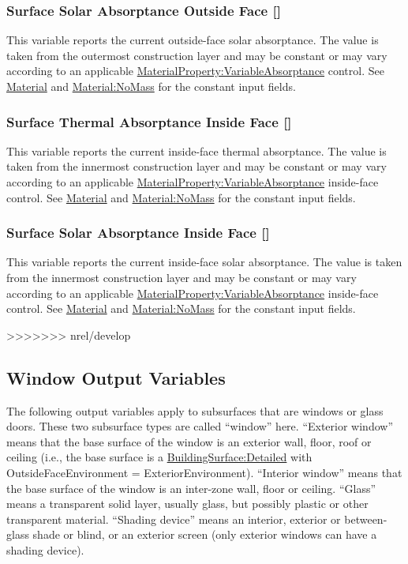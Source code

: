 \subsubsection{Surface Solar Absorptance Outside Face {[}{]}}\label{surface-solar-absorptance-outside-face}

This variable reports the current outside-face solar absorptance. The value is taken from the outermost construction layer and may be constant or may vary according to an applicable \hyperref[materialpropertyvariableabsorptance]{MaterialProperty:VariableAbsorptance} control. See \hyperref[material]{Material} and \hyperref[materialnomass]{Material:NoMass} for the constant input fields.

\subsubsection{Surface Thermal Absorptance Inside Face {[}{]}}\label{surface-thermal-absorptance-inside-face}

This variable reports the current inside-face thermal absorptance. The value is taken from the innermost construction layer and may be constant or may vary according to an applicable \hyperref[materialpropertyvariableabsorptance]{MaterialProperty:VariableAbsorptance} inside-face control. See \hyperref[material]{Material} and \hyperref[materialnomass]{Material:NoMass} for the constant input fields.

\subsubsection{Surface Solar Absorptance Inside Face {[}{]}}\label{surface-solar-absorptance-inside-face}

This variable reports the current inside-face solar absorptance. The value is taken from the innermost construction layer and may be constant or may vary according to an applicable \hyperref[materialpropertyvariableabsorptance]{MaterialProperty:VariableAbsorptance} inside-face control. See \hyperref[material]{Material} and \hyperref[materialnomass]{Material:NoMass} for the constant input fields.

>>>>>>> nrel/develop
\subsection{Window Output Variables}\label{window-output-variables-1}

The following output variables apply to subsurfaces that are windows or glass doors. These two subsurface types are called ``window'' here. ``Exterior window'' means that the base surface of the window is an exterior wall, floor, roof or ceiling (i.e., the base surface is a \hyperref[buildingsurfacedetailed]{BuildingSurface:Detailed} with OutsideFaceEnvironment = ExteriorEnvironment). ``Interior window'' means that the base surface of the window is an inter-zone wall, floor or ceiling. ``Glass'' means a transparent solid layer, usually glass, but possibly plastic or other transparent material. ``Shading device'' means an interior, exterior or between-glass shade or blind, or an exterior screen (only exterior windows can have a shading device).

